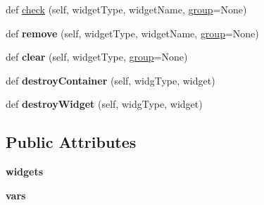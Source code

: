 \begin{DoxyCompactItemize}
\item 
def \hyperlink{class_python_01_g_u_i_1_1appjar_1_1_widget_manager_aaeef5f0473230a252d05fe78b7710991}{check} (self, widget\+Type, widget\+Name, \hyperlink{class_python_01_g_u_i_1_1appjar_1_1_widget_manager_a6fa4043a5945618a9ded50173f06599d}{group}=None)
\item 
\mbox{\label{class_python_01_g_u_i_1_1appjar_1_1_widget_manager_a8d104c35711907280a27f4c4631de3a1}} 
def {\bfseries remove} (self, widget\+Type, widget\+Name, \hyperlink{class_python_01_g_u_i_1_1appjar_1_1_widget_manager_a6fa4043a5945618a9ded50173f06599d}{group}=None)
\item 
\mbox{\label{class_python_01_g_u_i_1_1appjar_1_1_widget_manager_a313b5cba8598f7795334b3bcc1f07391}} 
def {\bfseries clear} (self, widget\+Type, \hyperlink{class_python_01_g_u_i_1_1appjar_1_1_widget_manager_a6fa4043a5945618a9ded50173f06599d}{group}=None)
\item 
\mbox{\label{class_python_01_g_u_i_1_1appjar_1_1_widget_manager_a9ee1d123576e15f6bc72d88c64e6ae8b}} 
def {\bfseries destroy\+Container} (self, widg\+Type, widget)
\item 
\mbox{\label{class_python_01_g_u_i_1_1appjar_1_1_widget_manager_a1d21f66abbcd764c7c36b7b949d51c0e}} 
def {\bfseries destroy\+Widget} (self, widg\+Type, widget)
\end{DoxyCompactItemize}
\subsection*{Public Attributes}
\begin{DoxyCompactItemize}
\item 
\mbox{\label{class_python_01_g_u_i_1_1appjar_1_1_widget_manager_a81cd5124dc15f776644a4db18d8e3b4e}} 
{\bfseries widgets}
\item 
\mbox{\label{class_python_01_g_u_i_1_1appjar_1_1_widget_manager_a0f80e1306166b9480c64e07cf03d7d00}} 
{\bfseries vars}
\end{DoxyCompactItemize}
